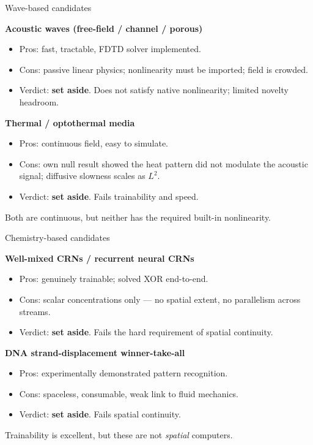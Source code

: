\documentclass[aspectratio=169,11pt]{beamer}
\begin{document}
\begin{frame}{Wave-based candidates}

\textbf{Acoustic waves (free-field / channel / porous)}
\begin{itemize}
    \item Pros: fast, tractable, FDTD solver implemented.
    \item Cons: passive linear physics; nonlinearity must be imported; field is crowded.
    \item Verdict: \textbf{set aside}. Does not satisfy native nonlinearity; limited novelty headroom.
\end{itemize}

\vspace{0.3cm}
\textbf{Thermal / optothermal media}
\begin{itemize}
    \item Pros: continuous field, easy to simulate.
    \item Cons: own null result showed the heat pattern did not modulate the acoustic signal; diffusive slowness scales as $L^2$.
    \item Verdict: \textbf{set aside}. Fails trainability and speed.
\end{itemize}

\vspace{0.2cm}
Both are continuous, but neither has the required built-in nonlinearity.

\end{frame}

\begin{frame}{Chemistry-based candidates}

\textbf{Well-mixed CRNs / recurrent neural CRNs}
\begin{itemize}
    \item Pros: genuinely trainable; solved XOR end-to-end.
    \item Cons: scalar concentrations only --- no spatial extent, no parallelism across streams.
    \item Verdict: \textbf{set aside}. Fails the hard requirement of spatial continuity.
\end{itemize}

\vspace{0.3cm}
\textbf{DNA strand-displacement winner-take-all}
\begin{itemize}
    \item Pros: experimentally demonstrated pattern recognition.
    \item Cons: spaceless, consumable, weak link to fluid mechanics.
    \item Verdict: \textbf{set aside}. Fails spatial continuity.
\end{itemize}

\vspace{0.2cm}
Trainability is excellent, but these are not \emph{spatial} computers.

\end{frame}
\end{document}
